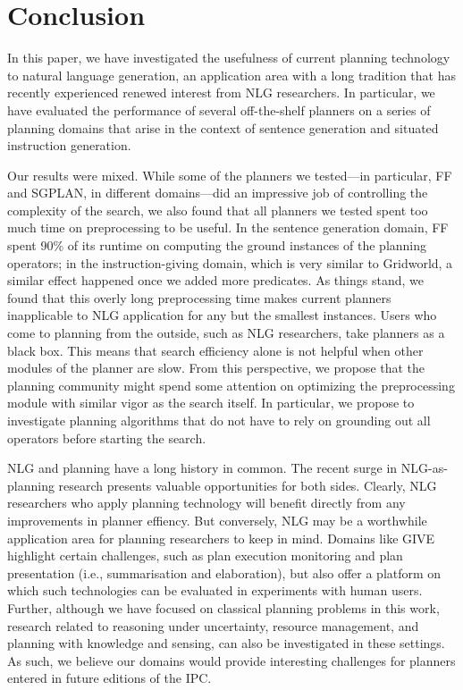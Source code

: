 \section{Conclusion}
\label{sec:conclusion}

In this paper, we have investigated the usefulness of current planning
technology to natural language generation, an application area with a
long tradition that has recently experienced renewed interest from NLG
researchers. In particular, we have evaluated the performance of
several off-the-shelf planners on a series of planning domains that
arise in the context of sentence generation and situated instruction
generation.

Our results were mixed. While some of the planners we tested---in
particular, FF and SGPLAN, in different domains---did an impressive
job of controlling the complexity of the search, we also found that
all planners we tested spent too much time on preprocessing to be
useful. In the sentence generation domain, FF spent 90\% of its
runtime on computing the ground instances of the planning operators;
in the instruction-giving domain, which is very similar to Gridworld,
a similar effect happened once we added more predicates. As things
stand, we found that this overly long preprocessing time makes current
planners inapplicable to NLG application for any but the smallest
instances. Users who come to planning from the outside, such as NLG
researchers, take planners as a black box. This means that search
efficiency alone is not helpful when other modules of the planner are
slow. From this perspective, we propose that the planning community
might spend some attention on optimizing the preprocessing module with
similar vigor as the search itself. In particular, we propose to
investigate planning algorithms that do not have to rely on grounding
out all operators before starting the search.

NLG and planning have a long history in common. The recent surge in
NLG-as-planning research presents valuable opportunities for both
sides. Clearly, NLG researchers who apply planning technology will
benefit directly from any improvements in planner effiency. But
conversely, NLG may be a worthwhile application area for planning
researchers to keep in mind. Domains like GIVE highlight certain
challenges, such as plan execution monitoring and plan presentation
(i.e., summarisation and elaboration), but also offer a platform on
which such technologies can be evaluated in experiments with human
users. Further, although we have focused on classical planning
problems in this work, research related to reasoning under
uncertainty, resource management, and planning with knowledge and
sensing, can also be investigated in these settings. As such, we
believe our domains would provide interesting challenges for planners
entered in future editions of the IPC.



